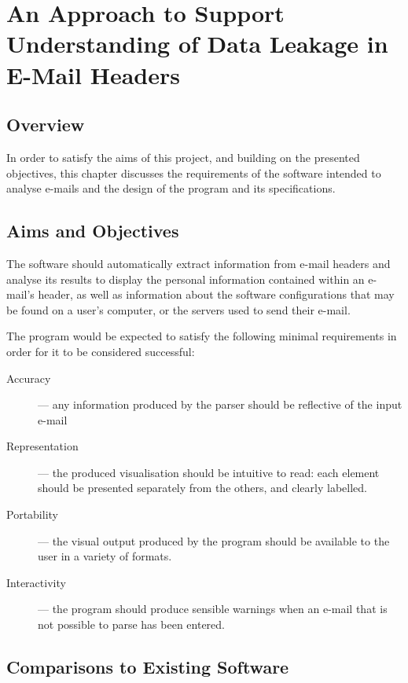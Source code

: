\chapter{An Approach to Support Understanding of Data Leakage in E-Mail Headers}\label{chap:des}

\section{Overview}

In order to satisfy the aims of this project, and building on the presented
objectives, this chapter discusses the requirements of the software intended to
analyse e-mails and the design of the program and its specifications.

\section{Aims and Objectives}

The software should automatically extract information from e-mail headers and
analyse its results to display the personal information contained within an
e-mail's header, as well as information about the software configurations that
may be found on a user's computer, or the servers used to send their e-mail.

The program would be expected to satisfy the following minimal requirements in
order for it to be considered successful: 

\begin{description} 
	
\item [{Accuracy}] --- any information produced by the parser should be
	reflective of the input e-mail

\item [{Representation}] --- the produced visualisation should be intuitive to
	read: each element should be presented separately from the others, and
	clearly labelled.

\item [{Portability}] --- the visual output produced by the program should be
	available to the user in a variety of formats.

\item [{Interactivity}] --- the program should produce sensible warnings when
	an e-mail that is not possible to parse has been entered.

\end{description}

\section{Comparisons to Existing Software}

